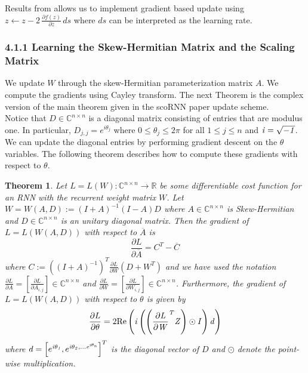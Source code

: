 \documentclass[letterpaper]{article} %
\newtheorem{theorem}{Theorem}
\begin{document}
\noindent Results from \cite{Kreutzdelgado09} allows us to implement gradient based update using $z \leftarrow z-2\, \frac{\partial f(z)}{\partial \overline{z}} \, ds$ where $ds$ can be interpreted as the learning rate. \\

\subsubsection{4.1.1 Learning the Skew-Hermitian Matrix and the Scaling Matrix}
\noindent We update $W$ through the skew-Hermitian parameterization matrix $A$. We compute the gradients using Cayley transform. The next Theorem is the complex version of the main theorem given in the scoRNN paper update scheme.\\

\noindent Notice that $D \in \mathbb{C}^{n \times n}$ is a diagonal matrix consisting of entries that are modulus one.  In particular, $D_{j,j} = e^{i\theta_j}$ where $0 \leq \theta_j \leq 2\pi$ for all $1 \leq j \leq n$ and $\it{i} = \sqrt{-1}$.  We can update the diagonal entries by performing gradient descent on the $\theta$ variables. The following theorem describes how to compute these gradients with respect to $\theta$. 

\begin{theorem}
\label{dldatheorem}
Let $L = L(W): \mathbb{C}^{n \times n}\rightarrow \mathbb{R}$ be some differentiable cost function for an RNN with the recurrent weight matrix $W$. Let $W = W(A,D) := (I+A)^{-1}(I-A)D$ where $A \in \mathbb{C}^{n \times n}$ is Skew-Hermitian and $D \in \mathbb{C}^{n \times n}$ is an unitary diagonal matrix. Then the gradient of $L = L(W(A,D))$ with respect to $\overline{A}$ is
$$ \frac{\partial L}{\partial \overline{A}} = C^T -\overline{C} $$
where $C:=((I+A)^{-1})^T \frac{\partial L}{\partial W}(D+W^T)$ and we have used the notation $\frac{\partial L}{\partial A}=\left[ \frac{\partial L}{\partial A_{i,j}} \right] \in \mathbb{C}^{n \times n}$ and $\frac{\partial L}{\partial W}=\left[ \frac{\partial L}{\partial W_{i,j}} \right] \in \mathbb{C}^{n \times n}$.
Furthermore, the gradient of $L = L(W(A,D))$ with respect to $\theta$ is given by
\[
	\frac{\partial L}{\partial \theta} = 2\text{Re}\left(\it{i} \left( \left(\frac{\partial L}{\partial W}^{T}Z \right)\odot I\right)d \right)
\]
where $d = \left[e^{\it{i}\theta_1}, e^{\it{i}\theta_2, ... e^{\it{i}\theta_n}} \right]^T$ is the diagonal vector of $D$ and $\odot$ denote the point-wise multiplication.
\end{theorem}
\end{document}
